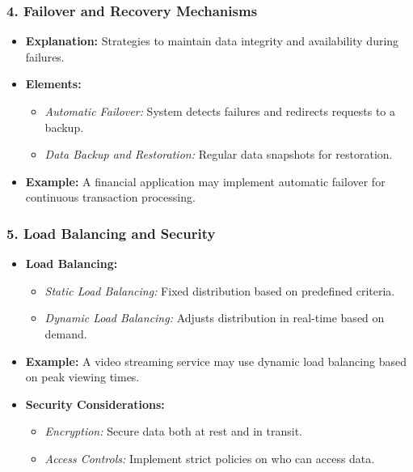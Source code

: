 \documentclass[aspectratio=169]{beamer}
\begin{document}
\begin{frame}[fragile]
    \frametitle{4. Failover and Recovery Mechanisms}
    \begin{itemize}
        \item \textbf{Explanation:} Strategies to maintain data integrity and availability during failures.
        \item \textbf{Elements:}
            \begin{itemize}
                \item \textit{Automatic Failover:} System detects failures and redirects requests to a backup.
                \item \textit{Data Backup and Restoration:} Regular data snapshots for restoration.
            \end{itemize}
        \item \textbf{Example:} A financial application may implement automatic failover for continuous transaction processing.
    \end{itemize}
\end{frame}

\begin{frame}[fragile]
    \frametitle{5. Load Balancing and Security}
    \begin{itemize}
        \item \textbf{Load Balancing:}
            \begin{itemize}
                \item \textit{Static Load Balancing:} Fixed distribution based on predefined criteria.
                \item \textit{Dynamic Load Balancing:} Adjusts distribution in real-time based on demand.
            \end{itemize}
        \item \textbf{Example:} A video streaming service may use dynamic load balancing based on peak viewing times.
        \item \textbf{Security Considerations:}
            \begin{itemize}
                \item \textit{Encryption:} Secure data both at rest and in transit.
                \item \textit{Access Controls:} Implement strict policies on who can access data.
            \end{itemize}
    \end{itemize}
\end{frame}
\end{document}
